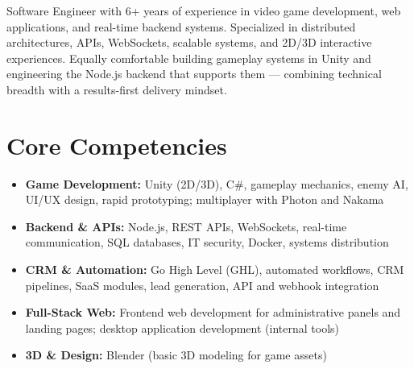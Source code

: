 \documentclass[11pt,a4paper,sans]{moderncv}
\begin{document}
\makecvtitle


\vspace{6pt}
\small{Software Engineer with 6+ years of experience in video game development, web applications, and real-time backend systems. Specialized in distributed architectures, APIs, WebSockets, scalable systems, and 2D/3D interactive experiences. Equally comfortable building gameplay systems in Unity and engineering the Node.js backend that supports them — combining technical breadth with a results-first delivery mindset.}


\section{Core Competencies}
\vspace{1pt}
\begin{itemize}

\item \textbf{Game Development:} Unity (2D/3D), C\#, gameplay mechanics, enemy AI, UI/UX design, rapid prototyping; multiplayer with Photon and Nakama

\item \textbf{Backend \& APIs:} Node.js, REST APIs, WebSockets, real-time communication, SQL databases, IT security, Docker, systems distribution

\item \textbf{CRM \& Automation:} Go High Level (GHL), automated workflows, CRM pipelines, SaaS modules, lead generation, API and webhook integration

\item \textbf{Full-Stack Web:} Frontend web development for administrative panels and landing pages; desktop application development (internal tools)

\item \textbf{3D \& Design:} Blender (basic 3D modeling for game assets)

\end{itemize}

\end{document}
